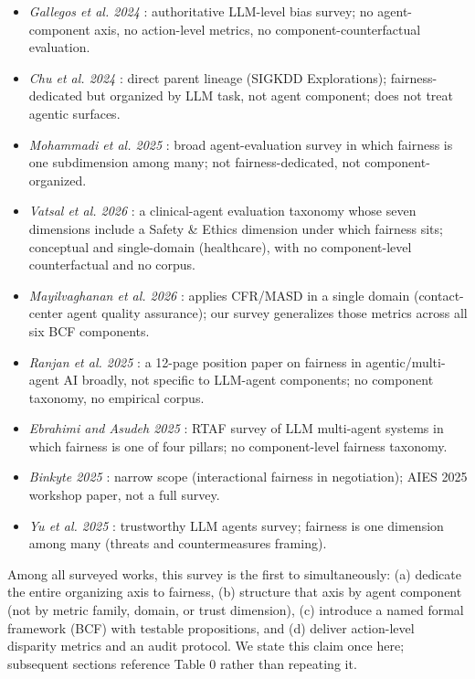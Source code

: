 \documentclass[10pt]{article}
\begin{document}
\begin{itemize}
\item \emph{Gallegos et al. 2024} \cite{gallegos2024bias}: authoritative LLM-level bias survey; no agent-component axis, no action-level metrics, no component-counterfactual evaluation.
\item \emph{Chu et al. 2024} \cite{chu2024fairness}: direct parent lineage (SIGKDD Explorations); fairness-dedicated but organized by LLM task, not agent component; does not treat agentic surfaces.
\item \emph{Mohammadi et al. 2025} \cite{mohammadi2025evaluation}: broad agent-evaluation survey in which fairness is one subdimension among many; not fairness-dedicated, not component-organized.
\item \emph{Vatsal et al. 2026} \cite{vatsal2026agentic}: a clinical-agent evaluation taxonomy whose seven dimensions include a Safety \& Ethics dimension under which fairness sits; conceptual and single-domain (healthcare), with no component-level counterfactual and no corpus.
\item \emph{Mayilvaghanan et al. 2026} \cite{mayilvaghanan2026counterfactual}: applies CFR/MASD in a single domain (contact-center agent quality assurance); our survey generalizes those metrics across all six BCF components.
\item \emph{Ranjan et al. 2025} \cite{ranjan2025fairness}: a 12-page position paper on fairness in agentic/multi-agent AI broadly, not specific to LLM-agent components; no component taxonomy, no empirical corpus.
\item \emph{Ebrahimi and Asudeh 2025} \cite{ebrahimi2025survey}: RTAF survey of LLM multi-agent systems in which fairness is one of four pillars; no component-level fairness taxonomy.
\item \emph{Binkyte 2025} \cite{binkyte2025interactional}: narrow scope (interactional fairness in negotiation); AIES 2025 workshop paper, not a full survey.
\item \emph{Yu et al. 2025} \cite{yu2025survey}: trustworthy LLM agents survey; fairness is one dimension among many (threats and countermeasures framing).
\end{itemize}

Among all surveyed works, this survey is the first to simultaneously: (a) dedicate the entire organizing axis to fairness, (b) structure that axis by agent component (not by metric family, domain, or trust dimension), (c) introduce a named formal framework (BCF) with testable propositions, and (d) deliver action-level disparity metrics and an audit protocol. We state this claim once here; subsequent sections reference Table 0 rather than repeating it.
\end{document}

